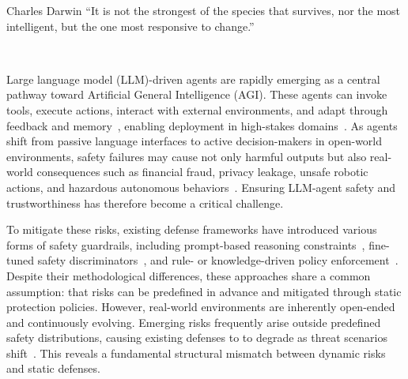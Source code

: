 

\begin{chapquote}{Charles Darwin}
``It is not the strongest of the species that survives, nor the most intelligent, but the one most responsive to change.''  
\end{chapquote}  


Large language model (LLM)-driven agents are rapidly emerging as a central pathway toward Artificial General Intelligence (AGI). These agents can invoke tools, execute actions, interact with external environments, and adapt through feedback and memory~\citep{fang2025comprehensivesurveyselfevolvingai,gao2025evovlesurvey}, enabling deployment in high-stakes domains~\citep{yu2025finmem,yang2024llmpsychology,gur2023webagent}. As agents shift from passive language interfaces to active decision-makers in open-world environments, safety failures may cause not only harmful outputs but also real-world consequences such as financial fraud, privacy leakage, unsafe robotic actions, and hazardous autonomous behaviors~\citep{yuan2024rjudge,han2025dme,mao2023driving}. Ensuring LLM-agent safety and trustworthiness has therefore become a critical challenge.

To mitigate these risks, existing defense frameworks have introduced various forms of safety guardrails, including prompt-based reasoning constraints~\citep{yin2024safeagentbench}, fine-tuned safety discriminators~\citep{zhang2024asb}, and rule- or knowledge-driven policy enforcement~\citep{xiang2024guardagent,sadhu2024athena}. Despite their methodological differences, these approaches share a common assumption: that risks can be predefined in advance and mitigated through static protection policies. However, real-world environments are inherently open-ended and continuously evolving. Emerging risks frequently arise outside predefined safety distributions, causing existing defenses to to degrade as threat scenarios shift~\citep{shahriar2025survey}. This reveals a fundamental structural mismatch between dynamic risks and static defenses.

